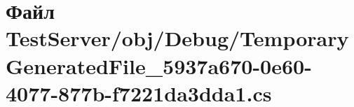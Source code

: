 \hypertarget{_test_server_2obj_2_debug_2_temporary_generated_file__5937a670-0e60-4077-877b-f7221da3dda1_8cs}{}\section{Файл Test\+Server/obj/\+Debug/\+Temporary\+Generated\+File\+\_\+5937a670-\/0e60-\/4077-\/877b-\/f7221da3dda1.cs}
\label{_test_server_2obj_2_debug_2_temporary_generated_file__5937a670-0e60-4077-877b-f7221da3dda1_8cs}

